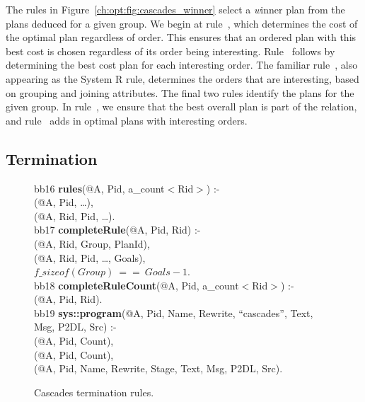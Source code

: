 The rules in Figure~\ref{ch:opt:fig:cascades_winner} select a {\emph winner}
plan from the plans deduced for a given group.  We begin at rule~,
which determines the cost of the optimal plan regardless of order.  This
ensures that an ordered plan with this best cost is chosen regardless of its
order being interesting.  Rule~ follows by determining the best cost
plan for each interesting order.  The familiar rule~, also appearing
as the  System R rule, determines the orders that are interesting,
based on grouping and joining attributes.  The final two rules identify the
 plans for the given group.  In rule~, we ensure that the
best overall plan is part of the  relation, and rule~ adds
in optimal plans with interesting orders.

\subsection{Termination}
\label{ch:opt:sec:cascadesend}

\begin{figure*}
\ssp
\centering
\begin{boxedminipage}{\linewidth}
bb16 {\bf rules}(@A, Pid, a\_count$<$Rid$>$) :-\\
(@A, Pid, \ldots), \\
(@A, Rid, Pid, \ldots). \\

bb17 {\bf completeRule}(@A, Pid, Rid) :- \\
(@A, Rid, Group, PlanId), \\
(@A, Rid, Pid, \ldots, Goals), \\
\datalogspace $f\_sizeof(Group)\ ==\ Goals - 1$. \\

bb18 {\bf completeRuleCount}(@A, Pid, a\_count$<$Rid$>$) :- \\
(@A, Pid, Rid). \\

bb19 {\bf sys::program}(@A, Pid, Name, Rewrite, ``cascades'', Text, Msg, P2DL, Src) :- \\
(@A, Pid, Count), \\
(@A, Pid, Count), \\
(@A, Pid, Name, Rewrite, Stage, Text, Msg, P2DL, Src).

\end{boxedminipage}
\caption{\label{ch:opt:fig:cascadesend}Cascades termination rules.}
\end{figure*}

